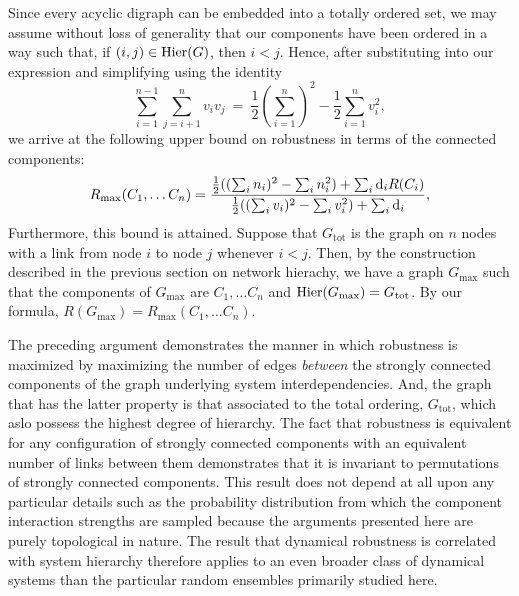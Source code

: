 Since every acyclic digraph can be embedded into a totally ordered set, we may assume without loss of generality that our components have been ordered in a way such that, if $(i,j) \in \mathrm{Hier}(G)$, then $i < j$.  Hence, after substituting into our expression and simplifying using the identity
$$\sum_{i=1}^{n-1}\sum_{j=i+1}^{n}v_i v_j~=~\frac{1}{2} \left( \sum_{i=1}^{n} \right)^2-\frac{1}{2} \sum_{i=1}^{n} v_i^2,$$
we arrive at the following upper bound on robustness in terms of the connected components:
\begin{align}
R_{\mathrm{max}}(C_1, \ldots C_n) =
\frac{\frac{1}{2} ((\sum_i n_i)^2 - \sum_i n_i^2) + \sum_i \mathrm{d}_i R(C_i)}
{\frac{1}{2} ((\sum_i v_i)^2 - \sum_i v_i^2) + \sum_i \mathrm{d}_i}, \label{eq:exsccmaxrobustness}
\end{align}
Furthermore, this bound is attained.  Suppose that $G_{\mathrm{tot}}$ is the graph on $n$ nodes with a link from node $i$ to node $j$ whenever $i < j$.  Then, by the construction described in the previous section on network hierachy, we have a graph $G_{\mathrm{max}}$ such that the components of $G_{\mathrm{max}}$ are $C_1, \ldots C_n$ and $\mathrm{Hier} (G_{\mathrm{max}}) = G_{\mathrm{tot}}$.  By our formula, $R(G_{\mathrm{max}}) = R_{\mathrm{max}}(C_1, \ldots C_n)$.

The preceding argument demonstrates the manner in which robustness is maximized by maximizing the number of edges \emph{between} the strongly connected components of the graph underlying system interdependencies. And, the graph that has the latter property is that associated to the total ordering, $G_{\mathrm{tot}}$, which aslo possess the highest degree of hierarchy. The fact that robustness is equivalent for any configuration of strongly connected components with an equivalent number of links between them demonstrates that it is invariant to permutations of strongly connected components. This result does not depend at all upon any particular details such as the probability distribution from which the component interaction strengths are sampled because the arguments presented here are purely topological in nature. The result that dynamical robustness is correlated with system hierarchy therefore applies to an even broader class of dynamical systems than the particular random ensembles primarily studied here.


